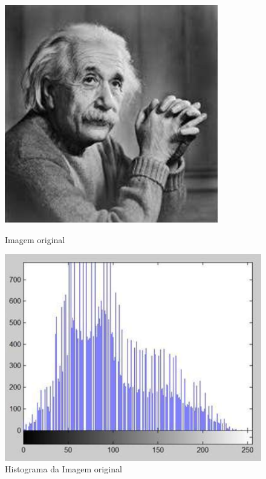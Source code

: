 \documentclass[a4paper, 12pt]{article}
\begin{document}
\begin{figure}[!htb]
	\centering
	  \includegraphics[width=\linewidth]{images/velho.png}
	  \caption{Imagem original}
	\endminipage\hspace{1cm}
	  \includegraphics[scale=0.3]{images/velhoHist.png}
	  \caption{Histograma da Imagem original}
	\endminipage
\end{figure}
\end{document}
